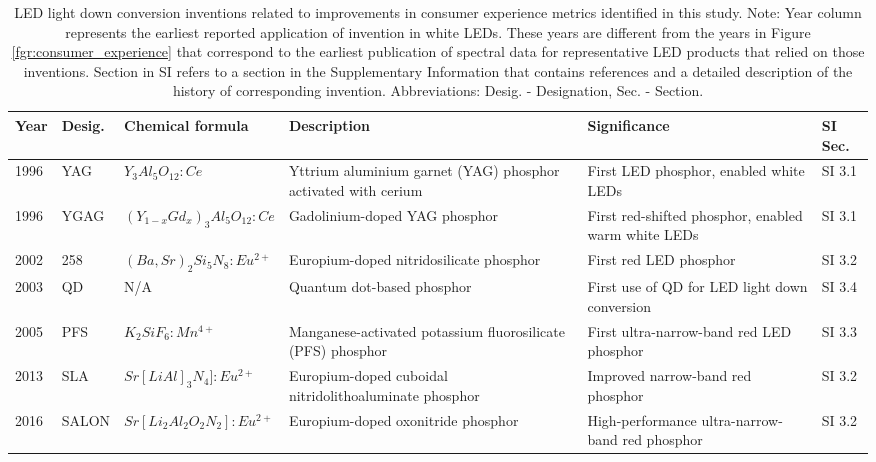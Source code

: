 \documentclass[twoside,twocolumn,9pt]{article}
\begin{document}
\begin{table}[h]
    \small
    \centering
    \begin{tabularx}{\textwidth}{|l|l|l|X|X|l|}
    \hline
        \textbf{Year} & \textbf{Desig.} & \textbf{Chemical formula} & \textbf{Description} & \textbf{Significance} & \textbf{SI Sec.} \\ \hline
        1996 & YAG & $Y_3 Al_5 O_{12}:Ce$ & Yttrium aluminium garnet (YAG) phosphor activated with cerium & First LED phosphor, enabled white LEDs & SI 3.1 \\ \hline
        1996 & YGAG & $(Y_{1-x} Gd_x)_3 Al_5 O_{12}:Ce$ & Gadolinium-doped YAG phosphor & First red-shifted phosphor, enabled warm white LEDs & SI 3.1 \\ \hline
        2002 & 258 & $(Ba,Sr)_2 Si_5 N_8:Eu^{2+}$ & Europium-doped nitridosilicate phosphor & First red LED phosphor & SI 3.2 \\ \hline
        2003 & QD & N/A & Quantum dot-based phosphor & First use of QD for LED light down conversion & SI 3.4 \\ \hline
        2005 & PFS & $K_2 SiF_6: Mn^{4+}$ & Manganese-activated potassium fluorosilicate (PFS) phosphor & First ultra-narrow-band red LED phosphor & SI 3.3 \\ \hline
        2013 & SLA & $Sr[Li Al]_3 N_4 ]:Eu^{2+}$ & Europium-doped cuboidal nitridolithoaluminate phosphor & Improved narrow-band red phosphor & SI 3.2 \\ \hline
        2016 & SALON & $Sr[Li_2 Al_2 O_2 N_2]:Eu^{2+}$ & Europium-doped oxonitride phosphor & High-performance ultra-narrow-band red phosphor & SI 3.2 \\ \hline
    \end{tabularx}
    \label{tab:phosphors}
    \caption{LED light down conversion inventions related to improvements in consumer experience metrics identified in this study. Note: Year column represents the earliest reported application of invention in white LEDs. These years are different from the years in Figure \ref{fgr:consumer_experience} that correspond to the earliest publication of spectral data for representative LED products  that relied on those inventions. Section in SI refers to a section in the Supplementary Information that contains references and a detailed description of the history of corresponding invention. Abbreviations: Desig. - Designation, Sec. - Section.}
\end{table}
\end{document}
